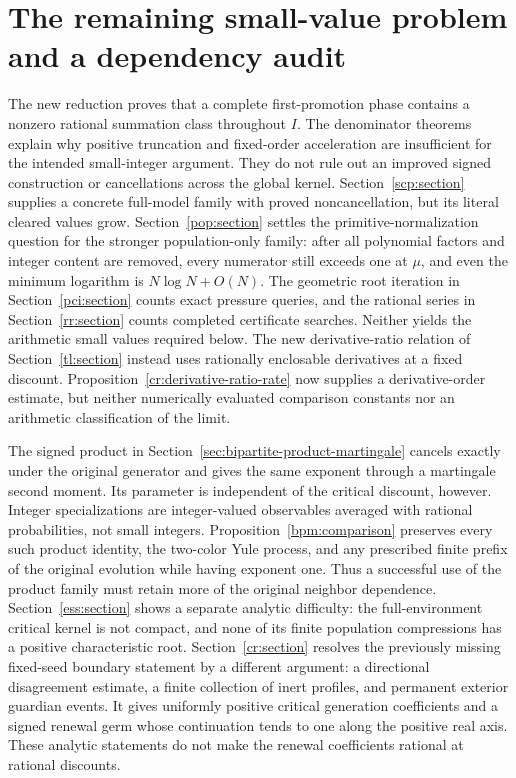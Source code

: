 \documentclass[11pt]{article}
\theoremstyle{remark}
\begin{document}
\section{The remaining small-value problem and a dependency audit}

The new reduction proves that a complete first-promotion phase contains
a nonzero rational summation class throughout $I$. The denominator
theorems explain why positive truncation and fixed-order acceleration
are insufficient for the intended small-integer argument. They do not
rule out an improved signed construction or cancellations across the
global kernel. Section~\ref{scp:section} supplies a concrete full-model
family with proved noncancellation, but its literal cleared values grow.
Section~\ref{pop:section} settles the primitive-normalization question
for the stronger population-only family: after all polynomial factors
and integer content are removed, every numerator still exceeds one at
$\mu$, and even the minimum logarithm is $N\log N+O(N)$.
The geometric root iteration in Section~\ref{pci:section} counts exact
pressure queries, and the rational series in Section~\ref{rr:section}
counts completed certificate searches. Neither yields the arithmetic
small values required below. The new derivative-ratio relation of
Section~\ref{tl:section} instead uses rationally enclosable derivatives
at a fixed discount. Proposition~\ref{cr:derivative-ratio-rate} now
supplies a derivative-order estimate, but neither numerically evaluated
comparison constants nor an arithmetic classification of the limit.

The signed product in Section~\ref{sec:bipartite-product-martingale}
cancels exactly under the original generator and gives the same exponent
through a martingale second moment. Its parameter is independent of the
critical discount, however. Integer specializations are integer-valued
observables averaged with rational probabilities, not small integers.
Proposition~\ref{bpm:comparison} preserves every such product identity,
the two-color Yule process, and any prescribed finite prefix of the
original evolution while having exponent one. Thus a successful use of
the product family must retain more of the original neighbor dependence.
Section~\ref{ess:section} shows a separate analytic difficulty:
the full-environment critical kernel is not compact, and none of its
finite population compressions has a positive characteristic root.
Section~\ref{cr:section} resolves the previously missing fixed-seed
boundary statement by a different argument: a directional disagreement
estimate, a finite collection of inert profiles, and permanent exterior
guardian events. It gives uniformly positive critical generation
coefficients and a signed renewal germ whose continuation tends to one
along the positive real axis. These analytic statements do not make
the renewal coefficients rational at rational discounts.
\end{document}
